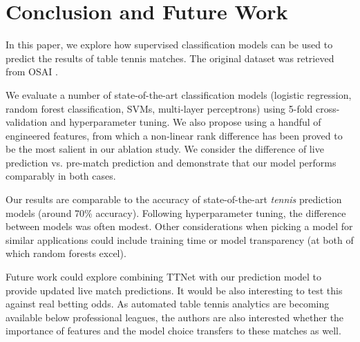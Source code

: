 \section{Conclusion and Future Work} \label{sec:conc}
In this paper, we explore how supervised classification models can be used to predict the results of table tennis matches.  The original dataset was retrieved from OSAI \cite{OSAI}.

We evaluate a number of state-of-the-art classification models (logistic regression, random forest classification, SVMs, multi-layer perceptrons) using 5-fold cross-validation and hyperparameter tuning. We also propose using a handful of engineered features, from which a non-linear rank difference has been proved to be the most salient in our ablation study. We consider the difference of live prediction vs. pre-match prediction and demonstrate that our model performs comparably in both cases.

Our results are comparable to the accuracy of state-of-the-art \textit{tennis} prediction models (around 70\% accuracy). Following hyperparameter tuning, the difference between models was often modest. Other considerations when picking a model for similar applications could include training time or model transparency (at both of which random forests excel). 

Future work could explore combining TTNet with our prediction model to provide updated live match predictions. It would be also interesting to test this against real betting odds. As automated table tennis analytics are becoming available below professional leagues, the authors are also interested whether the importance of features and the model choice transfers to these matches as well.


